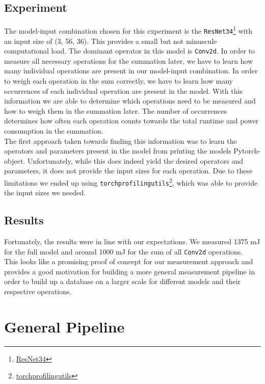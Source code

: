 \documentclass[conference]{IEEEtran}
\begin{document}
\subsection{Experiment}
The model-input combination chosen for this experiment is the \texttt{ResNet34}\footnote{\href{https://pytorch.org/vision/main/models/generated/torchvision.models.resnet34.html}{ResNet34}} with an input size of (3, 56, 36). This provides a small but not minuscule computational load. The dominant operator in this model is \texttt{Conv2d}. In order to measure all necessary operations for the summation later, we have to learn how many individual operations are present in our model-input combination. In order to weigh each operation in the sum correctly, we have to learn how many occurrences of each individual operation are present in the model. With this information we are able to determine which operations need to be measured and how to weigh them in the summation later. The number of occurrences determines how often each operation counts towards the total runtime and power consumption in the summation. \\
The first approach taken towards finding this information was to learn the operators and parameters present in the model from printing the models Pytorch-object. Unfortunately, while this does indeed yield the desired operators and parameters, it does not provide the input sizes for each operation. Due to these limitations we ended up using \texttt{torchprofilingutils}\footnote{\href{https://github.com/UniHD-CEG/torchprofilingutils}{torchprofilingutils}}, which was able to provide the input sizes we needed.


\subsection{Results}
Fortunately, the results were in line with our expectations. We measured 1375 mJ for the full model and around 1000 mJ for the sum of all \texttt{Conv2d} operations. \\
This looks like a promising proof of concept for our measurement approach and provides a good motivation for building a more general measurement pipeline in order to build up a database on a larger scale for different models and their respective operations. 

\section{General Pipeline}
\end{document}
